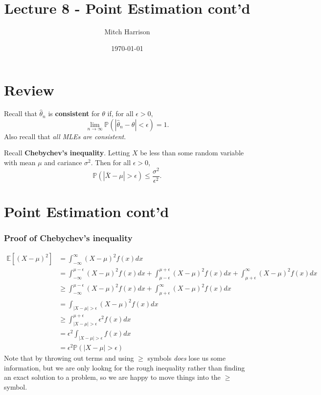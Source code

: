 \documentclass[titlepage, 12pt, leqno]{article}
\title{\Huge{Lecture 8 - Point Estimation cont'd}}
\author{\large{Mitch Harrison}}
\date{\today}
\begin{document}
\setlength{\parskip}{1\baselineskip}
\setlength{\parindent}{15pt}
\maketitle
\tableofcontents
\newpage


\section{Review}

Recall that $\hat \theta_{n}$ is \textbf{consistent} for $\theta$ if, for all
$\epsilon > 0$, 
\[
\lim_{n \to \infty} \mathbb{P}(|\hat \theta_{n}-\theta| < \epsilon) = 1.
\]
Also recall that \textit{all MLEs are consistent}. 

Recall \textbf{Chebychev's inequality}. Letting $X$ be less than some random
variable with mean $\mu$ and cariance $\sigma^{2}$. Then for all $\epsilon >0$,
\[
\mathbb{P}(|\bar X-\mu| > \epsilon) \le \frac{\sigma^{2}}{\epsilon^{2}}.
\]
\pagebreak
\section{Point Estimation cont'd}

\subsubsection{Proof of Chebychev's inequality}
\begin{align*}
    \mathbb{E}[(X-\mu)^{2}] &= \int_{-\infty}^{\infty}(X-\mu)^{2}f(x)dx \\
                            &= \int_{-\infty}^{\mu-\epsilon}(X-\mu)^{2}f(x)dx +
                            \int_{\mu-\epsilon}^{\mu+\epsilon}(X-\mu)^{2}f(x)dx+
                            \int_{\mu+\epsilon}^{\infty}(X-\mu)^{2}f(x)dx \\
                            &\ge \int_{-\infty}^{\mu-\epsilon}(X-\mu)^{2}f(x)dx+
                            \int_{\mu+\epsilon}^{\infty}(X-\mu)^{2}f(x)dx \\
                            &= \int_{|X-\mu| > \epsilon}(X-\mu)^{2}f(x)dx \\
                            &\ge \int_{|X-\mu|>\epsilon}^{\mu+\epsilon}
                            \epsilon^{2}f(x)dx \\
                            &= \epsilon^{2}\int_{|X-\mu|>\epsilon}f(x)dx \\
                            &= \epsilon^{2}\mathbb{P}(|X-\mu| > \epsilon)
\end{align*}
Note that by throwing out terms and using $\ge$ symbols \textit{does} lose us
some information, but we are only lookng for the rough inequality rather than
finding an exact solution to a problem, so we are happy to move things into the
$\ge$ symbol.
\end{document}
